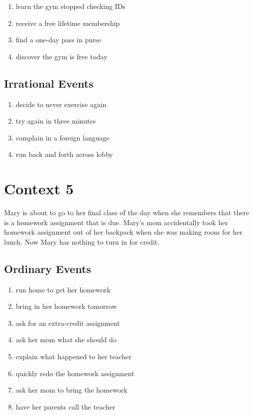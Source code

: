 \documentclass[11pt,letterpaper]{article}
\begin{document}
\begin{enumerate}[resume]
    \item learn the gym stopped checking IDs
    \item receive a free lifetime membership
    \item find a one-day pass in purse
    \item discover the gym is free today
\end{enumerate}

\subsection{Irrational Events}

\begin{enumerate}[resume]
    \item decide to never exercise again
    \item try again in three minutes
    \item complain in a foreign language
    \item run back and forth across lobby
\end{enumerate}

\section{Context 5}

Mary is about to go to her final class of the day when she remembers that there is a homework assignment that is due. Mary's mom accidentally took her homework assignment out of her backpack when she was making room for her lunch. Now Mary has nothing to turn in for credit.

\subsection{ Ordinary Events}

\begin{enumerate}[resume]
    \item run home to get her homework
    \item bring in her homework tomorrow
    \item ask for an extra-credit assignment
    \item ask her mom what she should do
    \item explain what happened to her teacher
    \item quickly redo the homework assignment
    \item ask her mom to bring the homework
    \item have her parents call the teacher
\end{enumerate}
\end{document}
